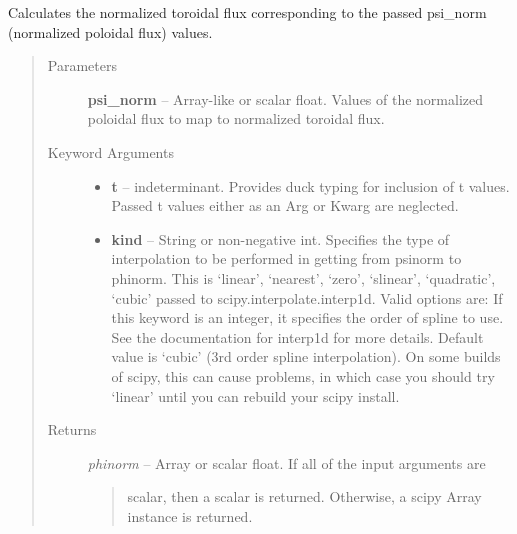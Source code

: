 \documentclass[letterpaper,10pt,english]{sphinxmanual}
\begin{document}
\begin{fulllineitems}
\begin{fulllineitems}
\end{fulllineitems}


\begin{fulllineitems}
\label{eqtools:eqtools.eqdskreader.EqdskReader.psinorm2phinorm}
Calculates the normalized toroidal flux corresponding to the passed psi\_norm (normalized poloidal flux) values.
\begin{quote}\begin{description}
\item[{Parameters }] \leavevmode
\textbf{psi\_norm} --
Array-like or scalar float.
Values of the normalized
poloidal flux to map to normalized toroidal flux.

\item[{Keyword Arguments}] \leavevmode\begin{itemize}
\item {} 
\textbf{t} --
indeterminant.
Provides duck typing for inclusion of t values. Passed t values
either as an Arg or Kwarg are neglected.

\item {} 
\textbf{kind} --
String or non-negative int.
Specifies the type of interpolation
to be performed in getting from psinorm to phinorm. This is
`linear', `nearest', `zero', `slinear', `quadratic', `cubic'
passed to scipy.interpolate.interp1d. Valid options are:
If this keyword is an integer, it specifies the order of spline
to use. See the documentation for interp1d for more details.
Default value is `cubic' (3rd order spline interpolation). On
some builds of scipy, this can cause problems, in which case
you should try `linear' until you can rebuild your scipy install.

\end{itemize}

\item[{Returns}] \leavevmode

\emph{phinorm} --
Array or scalar float. If all of the input arguments are
\begin{quote}

scalar, then a scalar is returned. Otherwise, a scipy Array
instance is returned.
\end{quote}


\end{description}\end{quote}

\end{fulllineitems}
\end{fulllineitems}
\end{document}
